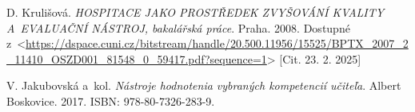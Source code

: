\begin{thebibliography}{99}

 D. Krulišová. \emph{HOSPITACE JAKO PROSTŘEDEK ZVYŠOVÁNÍ KVALITY A~EVALUAČNÍ NÁSTROJ, bakalářská práce}. Praha. 2008. Dostupné z~<\url{https://dspace.cuni.cz/bitstream/handle/20.500.11956/15525/BPTX_2007_2_11410_OSZD001_81548_0_59417.pdf?sequence=1}> [Cit. 23. 2. 2025]



 V. Jakubovská a~kol. \emph{Nástroje hodnotenia vybraných kompetencií učiteľa}. Albert Boskovice. 2017. ISBN: 978-80-7326-283-9. 


\end{thebibliography}
